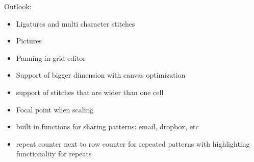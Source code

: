 Outlook:
\begin{itemize}
\item Ligatures and multi character stitches
\item Pictures
\item Panning in grid editor
\item Support of bigger dimension with canvas optimization
\item support of stitches that are wider than one cell
\item Focal point when scaling
\item built in functions for sharing patterns: email, dropbox, etc
\item repeat counter next to row counter for repeated patterns with highlighting functionality for repeats
\end{itemize}
